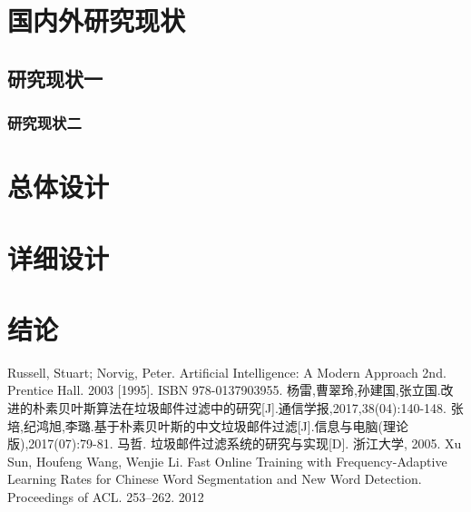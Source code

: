 \documentclass[UTF8,zihao=-4]{ctexart}
\begin{document}
\section{国内外研究现状}

\subsection{研究现状一}
\zhlipsum*[3]

\subsubsection{研究现状二}
\zhlipsum*[3]

\section{总体设计}
\zhlipsum*[4]

\section{详细设计}
\zhlipsum*[5]

\section{结论}
\zhlipsum*[6]


\begin{thebibliography}{99}
  \linespread{1.25}\songti{}
  Russell, Stuart; Norvig, Peter. Artificial Intelligence: A Modern Approach 2nd. Prentice Hall. 2003 [1995]. ISBN 978-0137903955.
  杨雷,曹翠玲,孙建国,张立国.改进的朴素贝叶斯算法在垃圾邮件过滤中的研究[J].通信学报,2017,38(04):140-148.
  张培,纪鸿旭,李璐.基于朴素贝叶斯的中文垃圾邮件过滤[J].信息与电脑(理论版),2017(07):79-81.
  马哲. 垃圾邮件过滤系统的研究与实现[D]. 浙江大学, 2005.
  Xu Sun, Houfeng Wang, Wenjie Li. Fast Online Training with Frequency-Adaptive Learning Rates for Chinese Word Segmentation and New Word Detection. Proceedings of ACL. 253–262. 2012
\end{thebibliography}
\end{document}
